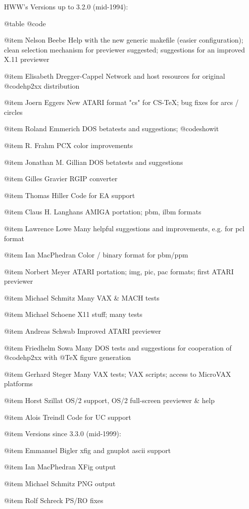 HWW's Versions up to 3.2.0 (mid-1994):

@table @code

@item Nelson Beebe
Help with the new generic makefile (easier configuration);
clean selection mechanism for previewer suggested;
suggestions for an improved X.11 previewer

@item Elisabeth Dregger-Cappel
Network and host resources for original @code{hp2xx} distribution

@item Joern Eggers
New ATARI format "cs" for CS-TeX; bug fixes for arcs / circles

@item Roland Emmerich
DOS betatests and suggestions; @code{showit}

@item R. Frahm
PCX color improvements

@item Jonathan M. Gillian
DOS betatests and suggestions

@item Gilles Gravier
RGIP converter

@item Thomas Hiller
Code for EA support

@item Claus H. Langhans
AMIGA portation; pbm, ilbm formats

@item Lawrence Lowe
Many helpful suggestions and improvements, e.g. for pcl format

@item Ian MacPhedran
Color / binary format for pbm/ppm

@item Norbert Meyer
ATARI portation; img, pic, pac formats; first ATARI previewer

@item Michael Schmitz
Many VAX & MACH tests

@item Michael Schoene
X11 stuff; many tests

@item Andreas Schwab
Improved ATARI previewer

@item Friedhelm Sowa
Many DOS tests and suggestions for cooperation of @code{hp2xx} with
@TeX{} figure generation

@item Gerhard Steger
Many VAX tests; VAX scripts; access to MicroVAX platforms

@item Horst Szillat
OS/2 support, OS/2 full-screen previewer & help

@item Alois Treindl
Code for UC support


@item Versions since 3.3.0 (mid-1999):

@item Emmanuel Bigler
xfig and gnuplot ascii support

@item Ian MacPhedran
XFig output

@item Michael Schmitz
PNG output

@item Rolf Schreck
PS/RO fixes


